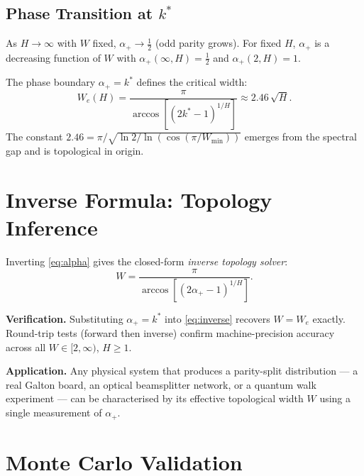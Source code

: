 \documentclass[12pt,a4paper]{article}
\newcommand{\kstar}{k^*}
\newcommand{\We}{W_e}
\newcommand{\alphap}{\alpha_+}
\begin{document}
\subsection{Phase Transition at $k^*$}

As $H\to\infty$ with $W$ fixed, $\alphap \to \tfrac{1}{2}$ (odd parity
grows). For fixed $H$, $\alphap$ is a decreasing function of $W$ with
$\alphap(\infty, H) = \tfrac{1}{2}$ and $\alphap(2, H) = 1$.

The phase boundary $\alphap = \kstar$ defines the critical width:
\begin{equation}\label{eq:Wc}
  \We(H) = \frac{\pi}{\arccos\!\left[(2\kstar-1)^{1/H}\right]}
         \approx 2.46\,\sqrt{H}.
\end{equation}
The constant $2.46 = \pi/\sqrt{\ln 2 / \ln(\cos(\pi/W_{\min}))}$
emerges from the spectral gap and is topological in origin.

\section{Inverse Formula: Topology Inference}
\label{sec:inverse}

Inverting \eqref{eq:alpha} gives the closed-form \emph{inverse topology
solver}:
\begin{equation}\label{eq:inverse}
  \boxed{W = \frac{\pi}{\arccos\!\left[(2\alphap-1)^{1/H}\right]}.}
\end{equation}

\textbf{Verification.} Substituting $\alphap = \kstar$ into \eqref{eq:inverse}
recovers $W = \We$ exactly. Round-trip tests (forward then inverse) confirm
machine-precision accuracy across all $W \in [2, \infty)$, $H \geq 1$.

\textbf{Application.} Any physical system that produces a parity-split
distribution — a real Galton board, an optical beamsplitter network, or a
quantum walk experiment — can be characterised by its effective topological
width $W$ using a single measurement of $\alphap$.

\section{Monte Carlo Validation}
\label{sec:mc}
\end{document}
